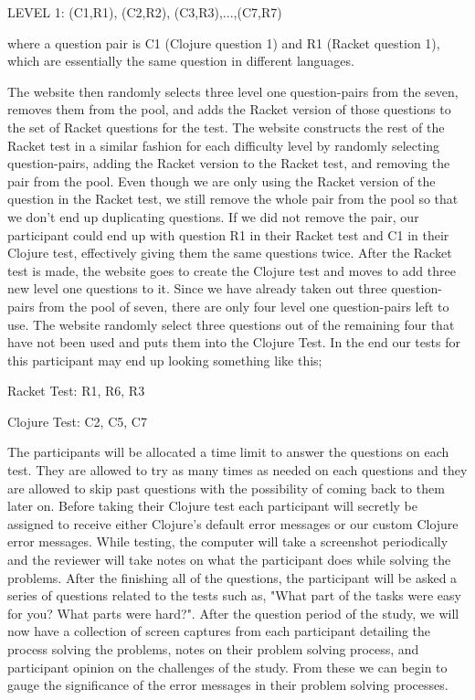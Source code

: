 \documentclass[12pt]{article}
\begin{document}
LEVEL 1: (C1,R1), (C2,R2), (C3,R3),...,(C7,R7)

where a question pair is C1 (Clojure question 1) and R1 (Racket question 1), which are essentially the same question in different languages. 

The website then randomly selects three level one question-pairs from the seven, removes them from the pool, and adds the Racket version of those questions to the set of Racket questions for the test.
The website constructs the rest of the Racket test in a similar fashion for each difficulty level by randomly selecting question-pairs, adding the Racket version to the  Racket test, and removing the pair from the pool.
Even though we are only using the Racket version of the question in the Racket test, we still remove the whole pair from the pool so that we don't end up duplicating questions.
If we did not remove the pair, our participant could end up with question R1 in their Racket test and C1 in their Clojure test, effectively giving them the same questions twice.
After the Racket test is made, the website goes to create the Clojure test and moves to add three new level one questions to it.
Since we have already taken out three question-pairs from the pool of seven, there are only four level one question-pairs left to use.
The website randomly select three questions out of the remaining four that have not been used and puts them into the Clojure Test.
In the end our tests for this participant may end up looking something like this; 

Racket Test: R1, R6, R3

Clojure Test: C2, C5, C7


	The participants will be allocated a time limit to answer the questions on each test. 
They are allowed to try as many times as needed on each questions and they are allowed to skip past questions with the possibility of coming back to them later on. 
Before taking their Clojure test each participant will secretly be assigned to receive either Clojure's default error messages or our custom Clojure error messages.
While testing, the computer will take a screenshot periodically and the reviewer will take notes on what the participant does while solving the problems.
After the finishing all of the questions, the participant will be asked a series of questions related to the tests such as, "What part of the tasks were easy for you? What parts were hard?".
After the question period of the study, we will now have a collection of screen captures from each participant detailing the process solving the problems, notes on their problem solving process, and participant opinion on the challenges of the study.
From these we can begin to gauge the significance of the error messages in their problem solving processes. 
\end{document}
